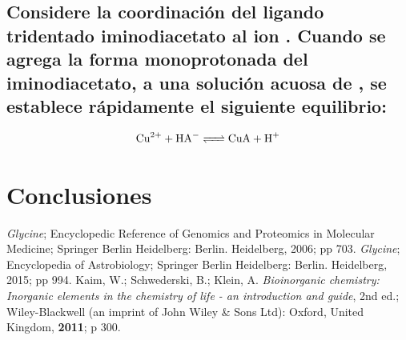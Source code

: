 \documentclass[fleqn,10pt]{SelfArx} %
\begin{document}
	\subsection{Considere la coordinaci\'on del ligando tridentado iminodiacetato al ion . Cuando se agrega la forma monoprotonada del iminodiacetato, a una soluci\'on acuosa de , se establece r\'apidamente el siguiente equilibrio:}
	\begin{equation}
	    \ce{Cu^{2+} + HA- <=> CuA + H+}
	\end{equation}
	
	\section{Conclusiones}
	
	
	\begin{thebibliography}{9}
	    \textit{Glycine}; Encyclopedic Reference of Genomics and Proteomics in Molecular Medicine; Springer Berlin Heidelberg: Berlin. Heidelberg, 2006; pp 703.
	    \textit{Glycine}; Encyclopedia of Astrobiology; Springer Berlin Heidelberg: Berlin. Heidelberg, 2015; pp 994.
	    Kaim, W.; Schwederski, B.; Klein, A. \textit{Bioinorganic chemistry: Inorganic elements in the chemistry of life - an introduction and guide}, 2nd ed.; Wiley-Blackwell (an imprint of John Wiley \& Sons Ltd): Oxford, United Kingdom, \textbf{2011}; p 300.
	\end{thebibliography}
\end{document}
